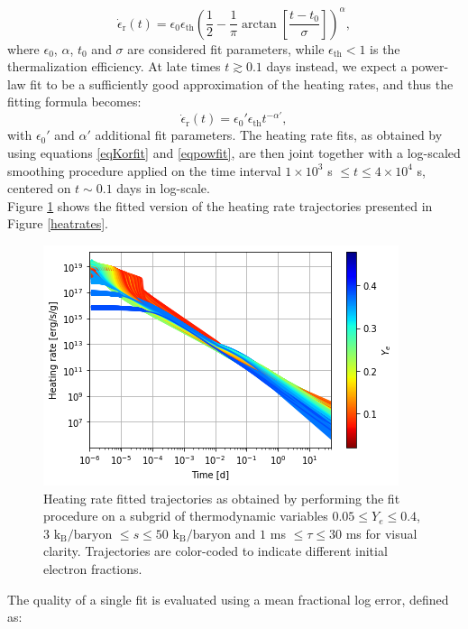 \documentclass[fleqn,usenatbib]{mnras}
\begin{document}
\begin{itemize}
    \begin{equation}
    \label{eqKorfit}
    \dot{\epsilon}_{\mathrm{r}}(t)=\epsilon_0\epsilon_{\mathrm{th}}\left(\frac{1}{2}-\frac{1}{\pi}\arctan{\left[\frac{t-t_0}{\sigma}\right]}\right)^{\alpha},
    \end{equation}
    where $\epsilon_0$, $\alpha$, $t_0$ and $\sigma$ are considered fit parameters, while $\epsilon_{\mathrm{th}}<1$ is the thermalization efficiency. At late times $t\gtrsim0.1$ days instead, we expect a power-law fit to be a sufficiently good approximation of the heating rates, and thus the fitting formula becomes:
    \begin{equation}
    \label{eqpowfit}
    \dot{\epsilon}_{\mathrm{r}}(t)=\epsilon_0'\epsilon_{\mathrm{th}}t^{-\alpha'},
    \end{equation}
    with $\epsilon_0'$ and $\alpha'$ additional fit parameters. The heating rate fits, as obtained by using equations \ref{eqKorfit} and \ref{eqpowfit}, are then joint together with a log-scaled smoothing procedure applied on the time interval $1\times10^3$ s $\leq t\leq4\times10^4$ s, centered on $t\sim0.1$ days in log-scale.\\
    Figure \ref{heatratesfit} shows the fitted version of the heating rate trajectories presented in Figure \ref{heatrates}.
    \begin{figure}
    \centering
    \includegraphics[scale=0.65]{heatratesfit.png}
    \caption{Heating rate fitted trajectories as obtained by performing the fit procedure on a subgrid of thermodynamic variables $0.05\leq Y_e\leq0.4$, $3$ $\mathrm{k_B/baryon}$ $\leq s\leq50$ $\mathrm{k_B/baryon}$ and $1$ ms $\leq\tau\leq30$ ms for visual clarity. Trajectories are color-coded to indicate different initial electron fractions.}
    \label{heatratesfit}
    \end{figure}
    The quality of a single fit is evaluated using a mean fractional log error, defined as:

\end{itemize}
\end{document}
